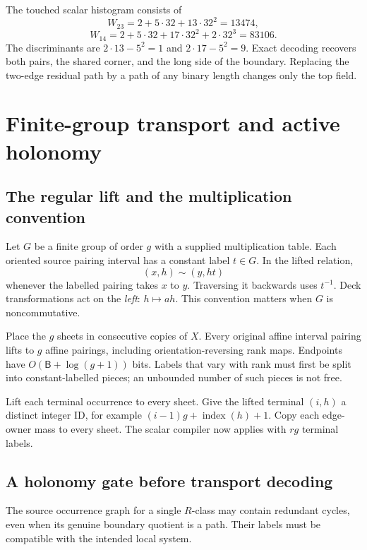 \documentclass[11pt]{article}
\theoremstyle{definition}\newtheorem{definition}[theorem]{Definition}\newtheorem{example}[theorem]{Example}
\theoremstyle{remark}\newtheorem{remark}[theorem]{Remark}
\newcommand{\bits}{\mathsf B}
\begin{document}
The touched scalar histogram consists of
\[
 W_{23}=2+5\cdot32+13\cdot32^2=13474,
\]
\[
 W_{14}=2+5\cdot32+17\cdot32^2+2\cdot32^3=83106.
\]
The discriminants are $2\cdot13-5^2=1$ and $2\cdot17-5^2=9$. Exact decoding recovers both pairs, the shared corner, and the long side of the boundary. Replacing the two-edge residual path by a path of any binary length changes only the top field.

\section{Finite-group transport and active holonomy}
\label{sec:group}
\subsection{The regular lift and the multiplication convention}
Let $G$ be a finite group of order $g$ with a supplied multiplication table. Each oriented source pairing interval has a constant label $t\in G$. In the lifted relation,
\begin{equation}\label{eq:lift}
                       (x,h)\sim(y,ht)
\end{equation}
whenever the labelled pairing takes $x$ to $y$. Traversing it backwards uses $t^{-1}$. Deck transformations act on the \emph{left}: $h\mapsto ah$. This convention matters when $G$ is noncommutative.

Place the $g$ sheets in consecutive copies of $X$. Every original affine interval pairing lifts to $g$ affine pairings, including orientation-reversing rank maps. Endpoints have $O(\bits+\log(g+1))$ bits. Labels that vary with rank must first be split into constant-labelled pieces; an unbounded number of such pieces is not free.

Lift each terminal occurrence to every sheet. Give the lifted terminal $(i,h)$ a distinct integer ID, for example $(i-1)g+\operatorname{index}(h)+1$. Copy each edge-owner mass to every sheet. The scalar compiler now applies with $rg$ terminal labels.

\subsection{A holonomy gate before transport decoding}
The source occurrence graph for a single $R$-class may contain redundant cycles, even when its genuine boundary quotient is a path. Their labels must be compatible with the intended local system.
\end{document}
